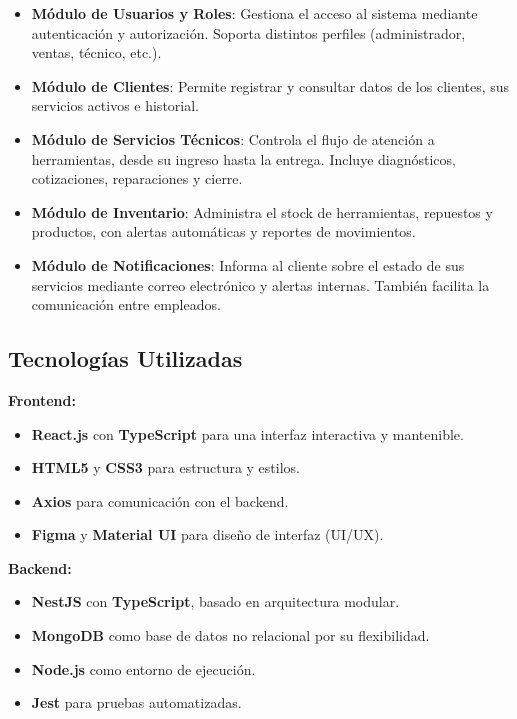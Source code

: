 \begin{itemize}
    \item \textbf{Módulo de Usuarios y Roles}: Gestiona el acceso al sistema mediante autenticación y autorización. Soporta distintos perfiles (administrador, ventas, técnico, etc.).
    
    \item \textbf{Módulo de Clientes}: Permite registrar y consultar datos de los clientes, sus servicios activos e historial.
    
    \item \textbf{Módulo de Servicios Técnicos}: Controla el flujo de atención a herramientas, desde su ingreso hasta la entrega. Incluye diagnósticos, cotizaciones, reparaciones y cierre.
    
    \item \textbf{Módulo de Inventario}: Administra el stock de herramientas, repuestos y productos, con alertas automáticas y reportes de movimientos.
    
    \item \textbf{Módulo de Notificaciones}: Informa al cliente sobre el estado de sus servicios mediante correo electrónico y alertas internas. También facilita la comunicación entre empleados.
\end{itemize}

\subsection{Tecnologías Utilizadas}

\textbf{Frontend:}
\begin{itemize}
    \item \textbf{React.js} con \textbf{TypeScript} para una interfaz interactiva y mantenible.
    \item \textbf{HTML5} y \textbf{CSS3} para estructura y estilos.
    \item \textbf{Axios} para comunicación con el backend.
    \item \textbf{Figma} y \textbf{Material UI} para diseño de interfaz (UI/UX).
\end{itemize}

\textbf{Backend:}
\begin{itemize}
    \item \textbf{NestJS} con \textbf{TypeScript}, basado en arquitectura modular.
    \item \textbf{MongoDB} como base de datos no relacional por su flexibilidad.
    \item \textbf{Node.js} como entorno de ejecución.
    \item \textbf{Jest} para pruebas automatizadas.
\end{itemize}

